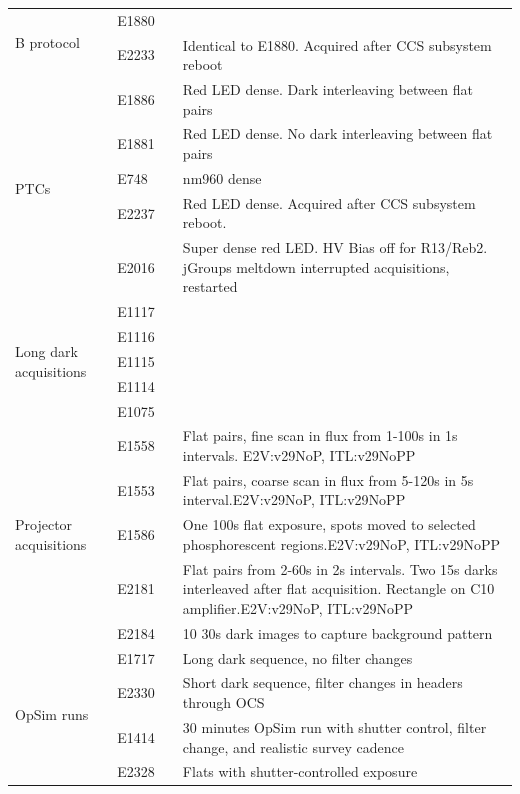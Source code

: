 \begin{longtable}{|p{2cm}|p{2cm}|p{2cm}|p{10cm}|}
\multirow{2}{=}{B protocol} & E1880 & & \\
& E2233 & & Identical to E1880. Acquired after CCS subsystem reboot \\ \hline
\multirow{5}{=}{PTCs} & E1886 & & Red LED dense. Dark interleaving between flat pairs \\ 
& E1881 & & Red LED dense. No dark interleaving between flat pairs \\ \hline
& E748 & & nm960 dense \\ \hline
& E2237 & & Red LED dense. Acquired after CCS subsystem reboot. \\ \hline
& E2016 & & Super dense red LED. HV Bias off for R13/Reb2. jGroups meltdown interrupted acquisitions, restarted \\ \hline
\multirow{5}{=}{Long dark acquisitions} & E1117 & & \\
& E1116 & & \\ \hline
& E1115 & & \\ \hline
& E1114 & & \\ \hline
& E1075 & & \\ \hline
\multirow{5}{=}{Projector acquisitions} & E1558 & & Flat pairs, fine scan in flux from 1-100s in 1s intervals. E2V:v29\label{nop}{NoP}, ITL:v29\label{nopp}{NoPP} \\
& E1553 & & Flat pairs, coarse scan in flux from 5-120s in 5s
interval.E2V:v29\label{nop}{NoP},
ITL:v29\label{nopp}{NoPP} \\ \hline
& E1586 & & One 100s flat exposure, spots moved to selected
phosphorescent regions.E2V:v29\label{nop}{NoP},
ITL:v29\label{nopp}{NoPP} \\ \hline
& E2181 & & Flat pairs from 2-60s in 2s intervals. Two 15s darks
interleaved after flat acquisition. Rectangle on C10
amplifier.E2V:v29\label{nop}{NoP},
ITL:v29\label{nopp}{NoPP} \\ \hline
& E2184 & & 10 30s dark images to capture background pattern \\ \hline
\multirow{5}{=}{OpSim runs} & E1717 & & Long dark sequence, no filter
changes \\ 
& E2330 & & Short dark sequence, filter changes in headers through
OCS \\ \hline
& E1414 & & 30 minutes OpSim run with shutter control, filter change,
and realistic survey cadence \\ \hline
& E2328 & & Flats with shutter-controlled exposure \\ \hline

\end{longtable}
